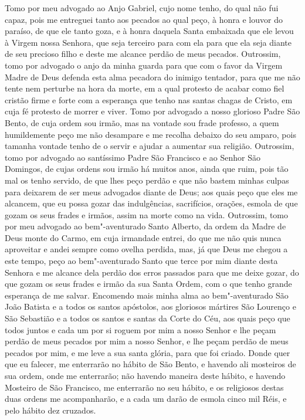Tomo por meu advogado ao Anjo Gabriel, cujo nome tenho, do qual não fui
capaz, pois me entreguei tanto aos pecados ao qual peço, à honra e
louvor do paraíso, de que ele tanto goza, e à honra daquela Santa
embaixada que ele levou à Virgem nossa Senhora, que seja terceiro para
com ela para que ela seja diante de seu precioso filho e deste me
alcance perdão de meus pecados. Outrossim, tomo por advogado o anjo da
minha guarda para que com o favor da Virgem Madre de Deus defenda esta
alma pecadora do inimigo tentador, para que me não tente nem perturbe
na hora da morte, em a qual protesto de acabar como fiel cristão firme
e forte com a esperança que tenho nas santas chagas de Cristo, em cuja
fé protesto de morrer e viver. Tomo por advogado a nosso glorioso Padre
São Bento, de cuja ordem sou irmão, mas na vontade sou frade professo,
a quem humildemente peço me não desampare e me recolha debaixo do seu
amparo, pois tamanha vontade tenho de o servir e ajudar a aumentar sua
religião. Outrossim, tomo por advogado ao santíssimo Padre São
Francisco e ao Senhor São Domingos, de cujas ordens sou irmão há muitos
anos, ainda que ruim, pois tão mal os tenho servido, de que lhes peço
perdão e que não bastem minhas culpas para deixarem de ser meus
advogados diante de Deus; aos quais peço que eles me alcancem, que eu
possa gozar das indulgências, sacrifícios, orações, esmola de que gozam
os seus frades e irmãos, assim na morte como na vida. Outrossim, tomo
por meu advogado ao bem"-aventurado Santo Alberto, da ordem da Madre de
Deus monte do Carmo, em cuja irmandade entrei, do que me não quis nunca
aproveitar e andei sempre como ovelha perdida, mas, já que Deus me
chegou a este tempo, peço ao bem"-aventurado Santo que terce por mim 
diante desta Senhora e me alcance dela perdão dos erros passados para
que me deixe gozar, do que gozam os seus frades e irmão da sua Santa
Ordem, com o que tenho grande esperança de me salvar. Encomendo mais
minha alma ao bem"-aventurado São João Batista e a todos os santos
apóstolos, aos gloriosos mártires São Lourenço e São Sebastião e a
todos os santos e santas da Corte do Céu, aos quais peço que todos
juntos e cada um por si roguem por mim a nosso Senhor e lhe peçam
perdão de meus pecados por mim a nosso Senhor, e lhe peçam perdão de
meus pecados por mim, e me leve a sua santa glória, para que foi
criado. Donde quer que eu falecer, me enterrarão no hábito de São
Bento, e havendo ali mosteiros de sua ordem, onde me enterrarão; não
havendo maneira deste hábito, e havendo Mosteiro de São Francisco, me
enterrarão no seu hábito, e os religiosos destas duas ordens me
acompanharão, e a cada um darão de esmola cinco mil Réis, e pelo hábito
dez cruzados. 

